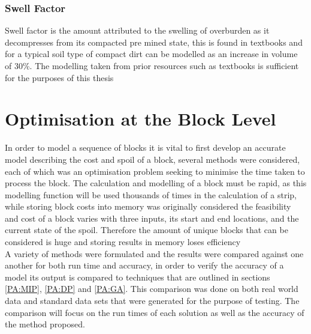 \subsubsection{Swell Factor}
Swell factor is the amount attributed to the swelling of overburden as it decompresses from its compacted pre mined state, this is found in textbooks and for a typical soil type of compact dirt can be modelled as an increase in volume of 30\%. The modelling taken from prior resources such as textbooks is sufficient for the purposes of this thesis 

	


\section{Optimisation at the Block Level}
In order to model a sequence of blocks it is vital to first develop an accurate model describing the cost and spoil of a block, several methods were considered, each of which was an optimisation problem seeking to minimise the time taken to process the block. The calculation and modelling of a block must be rapid, as this modelling function will be used thousands of times in the calculation of a strip, while storing block costs into memory was originally considered the feasibility and cost of a block varies with three inputs, its start and end locations, and the current state of the spoil. Therefore the amount of unique blocks that can be considered is huge and storing results in memory loses efficiency \\A variety of methods were formulated and the results were compared against one another for both run time and accuracy, in order to verify the accuracy of a model its output is compared to techniques that are outlined in sections \ref{PA:MIP}, \ref{PA:DP} and \ref{PA:GA}. This comparison was done on both real world data and standard data sets that were generated for the purpose of testing. The comparison will focus on the run times of each solution as well as the accuracy of the method proposed. 

